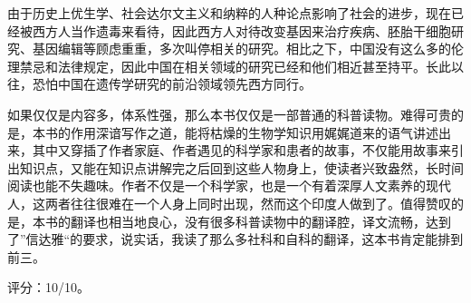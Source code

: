 由于历史上优生学、社会达尔文主义和纳粹的人种论点影响了社会的进步，现在已经被西方人当作遗毒来看待，因此西方人对待改变基因来治疗疾病、胚胎干细胞研究、基因编辑等顾虑重重，多次叫停相关的研究。相比之下，中国没有这么多的伦理禁忌和法律规定，因此中国在相关领域的研究已经和他们相近甚至持平。长此以往，恐怕中国在遗传学研究的前沿领域领先西方同行。

如果仅仅是内容多，体系性强，那么本书仅仅是一部普通的科普读物。难得可贵的是，本书的作用深谙写作之道，能将枯燥的生物学知识用娓娓道来的语气讲述出来，其中又穿插了作者家庭、作者遇见的科学家和患者的故事，不仅能用故事来引出知识点，又能在知识点讲解完之后回到这些人物身上，使读者兴致盎然，长时间阅读也能不失趣味。作者不仅是一个科学家，也是一个有着深厚人文素养的现代人，这两者往往很难在一个人身上同时出现，然而这个印度人做到了。值得赞叹的是，本书的翻译也相当地良心，没有很多科普读物中的翻译腔，译文流畅，达到了”信达雅“的要求，说实话，我读了那么多社科和自科的翻译，这本书肯定能排到前三。

评分：10/10。